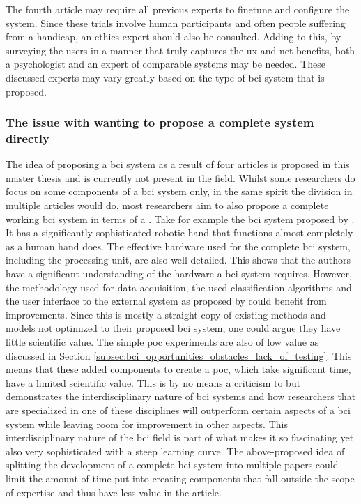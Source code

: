 The fourth article may require all previous experts to finetune and configure the system.
Since these trials involve human participants and often people suffering from a handicap, an ethics expert should also be consulted.
Adding to this, by surveying the users in a manner that truly captures the \gls{ux} and net benefits, both a psychologist and an expert of comparable systems may be needed.
These discussed experts may vary greatly based on the type of \gls{bci} system that is proposed.


\subsubsection{The issue with wanting to propose a complete system directly}
\label{subsubsec:bci_opportunities_obstacles_interdisciplinary_complete_system}

The idea of proposing a \gls{bci} system as a result of four articles is proposed in this master thesis and is currently not present in the field.
Whilst some researchers do focus on some components of a \gls{bci} system only, in the same spirit the division in multiple articles would do, most researchers aim to also propose a complete working \gls{bci} system in terms of a .
Take for example the \gls{bci} system proposed by \citet{complex_hand_few_classes}.
It has a significantly sophisticated robotic hand that functions almost completely as a human hand does.
The effective hardware used for the complete \gls{bci} system, including the processing unit, are also well detailed.
This shows that the authors have a significant understanding of the hardware a \gls{bci} system requires.
However, the methodology used for data acquisition, the used classification algorithms and the user interface to the external system as proposed by \citet{complex_hand_few_classes} could benefit from improvements.
Since this is mostly a straight copy of existing methods and models not optimized to their proposed \gls{bci} system, one could argue they have little scientific value.
The simple \gls{poc} experiments are also of low value as discussed in Section \ref{subsec:bci_opportunities_obstacles_lack_of_testing}.
This means that these added components to create a \gls{poc}, which take significant time, have a limited scientific value.
This is by no means a criticism to \citet{complex_hand_few_classes} but demonstrates the interdisciplinary nature of \gls{bci} systems and how researchers that are specialized in one of these disciplines will outperform certain aspects of a \gls{bci} system while leaving room for improvement in other aspects.
This interdisciplinary nature of the \gls{bci} field is part of what makes it so fascinating yet also very sophisticated with a steep learning curve.
The above-proposed idea of splitting the development of a complete \gls{bci} system into multiple papers could limit the amount of time put into creating components that fall outside the scope of expertise and thus have less value in the article.


